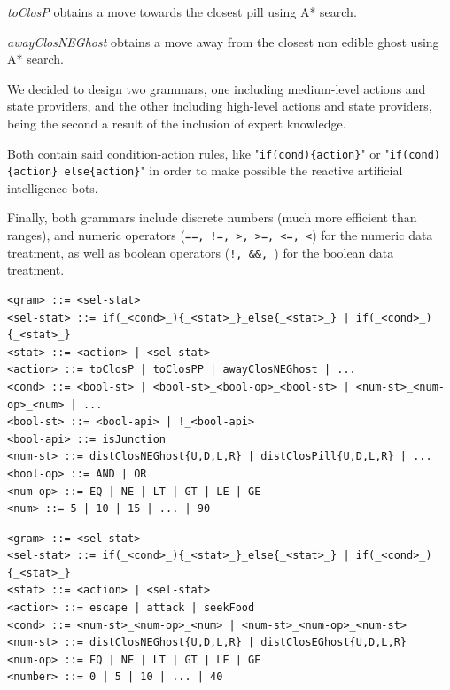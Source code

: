 \documentclass{llncs}
\newcommand\menostab[1][-0.5cm]{\hspace*{#1}}
\begin{document}
\menostab\textit{toClosP} obtains a move towards the closest pill using A* search.

\menostab\textit{awayClosNEGhost} obtains a move away from the closest non edible ghost using A* search.\newline

We decided to design two grammars, one including medium-level actions and state providers, and the other including high-level actions and state providers, being the second a result of the inclusion of expert knowledge.

Both contain said condition-action rules, like "\texttt{if(cond)\{action\}}" or "\texttt{if(cond)\{action\} else\{action\}}" in order to make possible the reactive artificial intelligence bots.

Finally, both grammars include discrete numbers (much more efficient than ranges), and numeric operators (\texttt{==, !=, >, >=, <=, <}) for the numeric data treatment, as well as boolean operators (\texttt{!, \&\&, \textbar\textbar})  for the boolean data treatment. 

\begin{lstlisting}[frame=single, caption=medium-level grammar, breaklines=true, basicstyle=\tiny]
<gram> ::= <sel-stat>
<sel-stat> ::= if(_<cond>_){_<stat>_}_else{_<stat>_} | if(_<cond>_){_<stat>_}
<stat> ::= <action> | <sel-stat>
<action> ::= toClosP | toClosPP | awayClosNEGhost | ...
<cond> ::= <bool-st> | <bool-st>_<bool-op>_<bool-st> | <num-st>_<num-op>_<num> | ...
<bool-st> ::= <bool-api> | !_<bool-api>
<bool-api> ::= isJunction
<num-st> ::= distClosNEGhost{U,D,L,R} | distClosPill{U,D,L,R} | ...
<bool-op> ::= AND | OR
<num-op> ::= EQ | NE | LT | GT | LE | GE
<num> ::= 5 | 10 | 15 | ... | 90
\end{lstlisting} %

\begin{lstlisting}[frame=single, caption=high-level grammar, breaklines=true, basicstyle=\tiny]
<gram> ::= <sel-stat>
<sel-stat> ::= if(_<cond>_){_<stat>_}_else{_<stat>_} | if(_<cond>_){_<stat>_}
<stat> ::= <action> | <sel-stat>
<action> ::= escape | attack | seekFood
<cond> ::= <num-st>_<num-op>_<num> | <num-st>_<num-op>_<num-st>
<num-st> ::= distClosNEGhost{U,D,L,R} | distClosEGhost{U,D,L,R}
<num-op> ::= EQ | NE | LT | GT | LE | GE
<number> ::= 0 | 5 | 10 | ... | 40
\end{lstlisting} %
\end{document}
